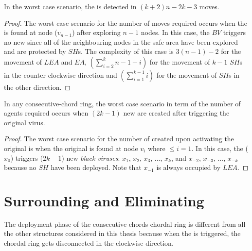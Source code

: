 \begin{theorem}

In the worst case scenario, the \bv is detected in $(k+2)n-2k-3$ moves.
\end{theorem}
\begin{proof}
The worst case scenario for the number of moves required occurs when the \bv  is found at node ($v_{n-1}$) after exploring $n-1$ nodes.  
  In this case, the $BV$ triggers no new \bvs since all of the neighbouring nodes in the safe area have been explored and are protected by $SH$s.
The complexity of this case is  $3(n-1)-2$ for the movement of $LEA$ and $EA$, $(\sum\limits_{i=2}^k n-1-i)$ for the movement of $k-1$ $SH$s in the counter clockwise direction and $(\sum\limits_{i=1}^{k-1}i)$ for the movement of  $SH$s in the other direction.
\end{proof}
%

%
\begin{theorem}

In any consecutive-chord ring, the worst case scenario in term of the number of agents required occurs when $(2k-1)$ new \bvs are created after triggering the original virus.
\end{theorem}

\begin{proof}
The worst case scenario for the number of \bvs created upon activating the original \bv is when the original is found at node $v_i$ where $\leq i =1$. In this case, the \bv ($x_0$)  triggers ($2k-1$) new {\it black viruses}:  $x_1$, $x_2$, $x_3$, ..., $x_k$, and  $x_{-2}$, $x_{-3}$, ..., $x_{-k}$ because no $SH$ have been deployed. Note that  $x_{-1} $ is always occupied by $LEA$.

\end{proof}








\section{Surrounding and Eliminating}


The deployment phase of the consecutive-chords chordal ring is different from all the other structures considered in this thesis because when the \bv is triggered, the chordal ring gets disconnected in the clockwise direction. 
 
